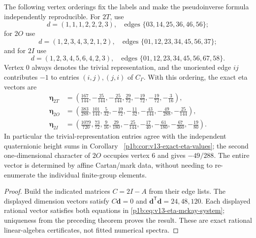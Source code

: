 \documentclass[11pt]{article}
\begin{document}
\begin{corollary}
\label{p1b:cor:v13-all-irrep-etas}
The following vertex orderings fix the labels and make the
pseudoinverse formula independently reproducible. For $2T$, use
\[
 d=(1,1,1,2,2,2,3),\quad\text{edges }\{03,14,25,36,46,56\};
\]
for $2O$ use
\[
 d=(1,2,3,4,3,2,1,2),\quad\text{edges }\{01,12,23,34,45,56,37\};
\]
and for $2I$ use
\[
 d=(1,2,3,4,5,6,4,2,3),\quad\text{edges }\{01,12,23,34,45,56,67,58\}.
\]
Vertex $0$ always denotes the trivial representation, and the
unoriented edge $ij$ contributes $-1$ to entries $(i,j),(j,i)$ of
$C_\Gamma$. With this ordering, the exact eta vectors are
\[
\begin{aligned}
\boldsymbol\eta_{2T}&=
 (\tfrac{167}{144},-\tfrac{25}{144},-\tfrac{25}{144},
   \tfrac{29}{72},-\tfrac{19}{72},-\tfrac{19}{72},-\tfrac{3}{16}),\\[2pt]
\boldsymbol\eta_{2O}&=
 (\tfrac{383}{288},\tfrac{101}{144},\tfrac{5}{32},
   -\tfrac{19}{72},-\tfrac{11}{32},-\tfrac{43}{144},
   -\tfrac{49}{288},-\tfrac{25}{144}),\\[2pt]
\boldsymbol\eta_{2I}&=
 (\tfrac{1079}{720},\tfrac{73}{72},\tfrac{9}{16},
   \tfrac{29}{180},-\tfrac{25}{144},-\tfrac{17}{40},
   -\tfrac{61}{180},-\tfrac{67}{360},-\tfrac{19}{80}).
\end{aligned}
\]
In particular the trivial-representation entries agree with the
independent quaternionic height sums in Corollary~
\ref{p1b:cor:v13-exact-eta-values}; the second one-dimensional
character of $2O$ occupies vertex $6$ and gives $-49/288$.
The entire vector is determined by affine Cartan/mark data, without
needing to re-enumerate the individual finite-group elements.
\end{corollary}
\begin{proof}
Build the indicated matrices $C=2I-A$ from their edge lists.
The displayed dimension vectors satisfy $C\boldsymbol d=0$ and
$\boldsymbol d^{\mathsf T}\boldsymbol d=24,48,120$.
Each displayed rational vector satisfies both equations in
\eqref{p1b:eq:v13-eta-mckay-system}; uniqueness from the
preceding theorem proves the result.  These are exact rational
linear-algebra certificates, not fitted numerical spectra.
\end{proof}
\end{document}
